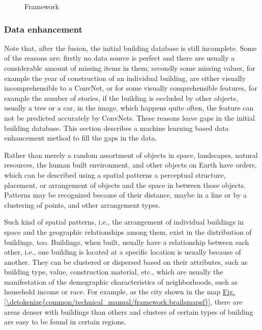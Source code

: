 \documentclass[letterpaper,10pt,english]{sphinxmanual}
\begin{document}
\begin{figure}[htbp]
\centering
\capstart

\noindent{}
\caption{Framework}\label{\detokenize{common/technical_manual/framework:id13}}\label{\detokenize{common/technical_manual/framework:brailsfusion}}\end{figure}


\subsubsection{Data enhancement}
\label{\detokenize{common/technical_manual/framework:data-enhancement}}\label{\detokenize{common/technical_manual/framework:enhance}}
\sphinxAtStartPar
Note that, after the fusion, the initial building database is still incomplete.
Some of the reasons are:
firstly no data source is perfect and there are usually a considerable amount of missing items in them;
secondly some missing values, for example the year of construction of an individual building,
are either visually incomprehensible to a ConvNet,
or for some visually comprehensible features, for example the number of stories,
if the building is occluded by other objects, usually a tree or a car, in the image,
which happens quite often, the feature can not be predicted accurately by ConvNets.
These reasons leave gaps in the initial building database.
This section describes a machine learning \sphinxhyphen{} based data enhancement method to
fill the gaps in the data.

\sphinxAtStartPar
Rather than merely a random assortment of objects in space,
landscapes, natural resources, the human built environment,
and other objects on Earth have orders, which can be described using a
spatial patterns \sphinxhyphen{} a perceptual structure, placement,
or arrangement of objects and the space in between those objects.
Patterns may be recognized because of their distance,
maybe in a line or by a clustering of points, and other arrangement types.

\sphinxAtStartPar
Such kind of spatial patterns, i.e., the arrangement of individual buildings
in space and the geographic relationships among them, exist in the distribution of buildings, too.
Buildings, when built, usually have a relationship between each other, i.e.,
one building is located at a specific location is usually because of another.
They can be clustered or dispersed based on their attributes,
such as building type, value, construction material, etc., which are usually the
manifestation of the demographic characteristics of neighborhoods,
such as household income or race.
For example, as the city shown in the map \hyperref[\detokenize{common/technical_manual/framework:brailsmapsf}]{Fig.\@ \ref{\detokenize{common/technical_manual/framework:brailsmapsf}}},
there are areas denser with buildings than others and clusters of
certain types of building are easy to be found in certain regions.
\end{document}
